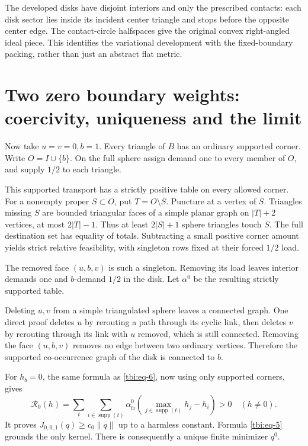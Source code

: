 The developed disks have disjoint interiors and only the prescribed contacts: each disk sector lies inside its incident center triangle and stops before the opposite center edge. The contact-circle halfspaces give the original convex right-angled ideal piece. This identifies the variational development with the fixed-boundary packing, rather than just an abstract flat metric.

\section{Two zero boundary weights: coercivity, uniqueness and the limit}\label{tbi:sec-4}

Now take \(u=v=0,b=1\). Every triangle of \(B\) has an ordinary supported corner. Write \(O=I\cup\{b\}\). On the full sphere assign demand one to every member of \(O\), and supply \(1/2\) to each triangle.

This supported transport has a strictly positive table on every allowed corner. For a nonempty proper \(S\subset O\), put \(T=O\setminus S\). Puncture at a vertex of \(S\). Triangles missing \(S\) are bounded triangular faces of a simple planar graph on \(|T|+2\) vertices, at most \(2|T|-1\). Thus at least \(2|S|+1\) sphere triangles touch \(S\). The full destination set has equality of totals. Subtracting a small positive corner amount yields strict relative feasibility, with singleton rows fixed at their forced \(1/2\) load.

The removed face \((u,b,v)\) is such a singleton. Removing its load leaves interior demands one and \(b\)-demand \(1/2\) in the disk. Let \(\alpha^0\) be the resulting strictly supported table.

Deleting \(u,v\) from a simple triangulated sphere leaves a connected graph. One direct proof deletes \(u\) by rerouting a path through its cyclic link, then deletes \(v\) by rerouting through its link with \(u\) removed, which is still connected. Removing the face \((u,b,v)\) removes no edge between two ordinary vertices. Therefore the supported co-occurrence graph of the disk is connected to \(b\).

For \(h_b=0\), the same formula as \eqref{tbi:eq-6}, now using only supported corners, gives
\begin{equation}\label{tbi:eq-9}
\mathcal R_0(h)=
\sum_t\sum_{i\in\operatorname{supp}(t)}
\alpha^0_{ti}\left(\max_{j\in\operatorname{supp}(t)}h_j-h_i\right)>0
\quad(h\ne0).
\end{equation}
It proves \(J_{0,0,1}(q)\ge c_0\lVert q\rVert\) up to a harmless constant. Formula \eqref{tbi:eq-5} grounds the only kernel. There is consequently a unique finite minimizer \(q^0\).

